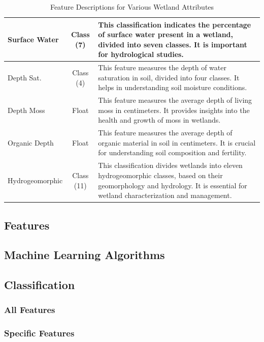 \documentclass[12pt,letterpaper]{article}
\begin{document}
\begin{table}[h]
\begin{tabular}{|m{3cm}|c|m{11cm}|}
        \hline
        Surface Water & Class (7) & This classification indicates the percentage of surface water present in a wetland, divided into seven classes. It is important for hydrological studies. \\
        \hline
        Depth Sat. & Class (4) & This feature measures the depth of water saturation in soil, divided into four classes. It helps in understanding soil moisture conditions. \\
        \hline
        Depth Moss & Float & This feature measures the average depth of living moss in centimeters. It provides insights into the health and growth of moss in wetlands. \\
        \hline
        Organic Depth & Float & This feature measures the average depth of organic material in soil in centimeters. It is crucial for understanding soil composition and fertility. \\
        \hline
        Hydrogeomorphic & Class (11) & This classification divides wetlands into eleven hydrogeomorphic classes, based on their geomorphology and hydrology. It is essential for wetland characterization and management. \\
        \hline
    \end{tabular}
    \caption{Feature Descriptions for Various Wetland Attributes}
    \label{tab:data_xtra_features}
\end{table}


\subsection{Features}


\clearpage
\subsection{Machine Learning Algorithms}\label{sec:algorithms}


\subsection{Classification}\label{sec:class_annex}
\subsubsection{All Features}


\subsubsection{Specific Features}

\end{document}
